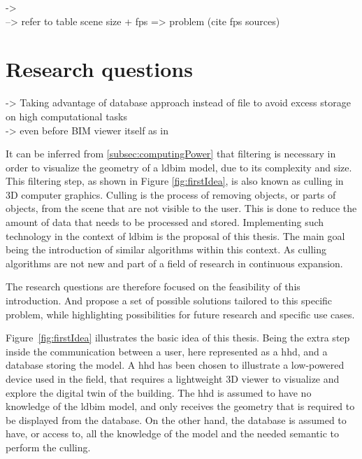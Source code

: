 -> \cite{Johansson2015} \\
--> refer to table scene size + fps => problem (cite fps sources)

\section{Research questions}
-> Taking advantage of database approach instead of file to avoid excess storage on high computational tasks\\
-> even before BIM viewer itself as in \cite{Johansson2015}

It can be inferred from \ref{subsec:computingPower} that filtering is necessary in order to visualize the geometry of a \ac{ldbim} model, due to its complexity and size. This filtering step, as shown in Figure \ref{fig:firstIdea}, is also known as culling in 3D computer graphics. Culling is the process of removing objects, or parts of objects, from the scene that are not visible to the user. This is done to reduce the amount of data that needs to be processed and stored. Implementing such technology in the context of \ac{ldbim} is the proposal of this thesis. The main goal being the introduction of similar algorithms within this context. As culling algorithms are not new and part of a field of research in continuous expansion.

The research questions are therefore focused on the feasibility of this introduction. And propose a set of possible solutions tailored to this specific problem, while highlighting possibilities for future research and specific use cases.

Figure~\ref{fig:firstIdea} illustrates the basic idea of this thesis. Being the extra step inside the communication between a user, here represented as a \ac{hhd}, and a database storing the model. A \ac{hhd} has been chosen to illustrate a low-powered device used in the field, that requires a lightweight 3D viewer to visualize and explore the digital twin of the building. The \ac{hhd} is assumed to have no knowledge of the \ac{ldbim} model, and only receives the geometry that is required to be displayed from the database. On the other hand, the database is assumed to have, or access to, all the knowledge of the model and the needed semantic to perform the culling.

